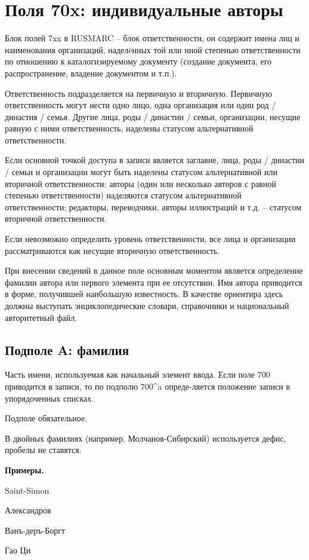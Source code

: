 \chapter{Поля 70x: индивидуальные авторы}

Блок полей 7xx в RUSMARC  -- блок ответственности, он содержит имена лиц и наименования организаций, надел\"eнных той или иной степенью ответственности по отношению к каталогизируемому документу (создание документа, его распространение, владение документом и т.п.).

Ответственность подразделяется на первичную и вторичную. Первичную ответственность могут нести одно лицо, одна организация или один род / династия / семья. Другие лица, роды / династии / семьи, организации, несущие равную с ними ответственность, наделены статусом альтернативной ответственности.

Если основной точкой доступа в записи является заглавие, лица, роды / династии / семьи и организации могут быть наделены статусом альтернативной или вторичной ответственности: авторы (один или несколько авторов с равной степенью ответственности) наделяются статусом альтернативной ответственности; редакторы, переводчики, авторы иллюстраций и т.д. -- статусом вторичной ответственности.

Если невозможно определить уровень ответственности, все лица и организации рассматриваются как несущие вторичную ответственность.

При внесении сведений в данное поле основным моментом является определение фамилии автора или первого элемента при ее отсутствии. Имя автора приводится в форме, получившей наибольшую известность. В качестве ориентира здесь должны выступать энциклопедические словари, справочники и национальный авторитетный файл.

\section{Подполе A: фамилия}

Часть имени, используемая как начальный элемент ввода. Если поле 700 приводится в записи, то по подполю 700\^{}a опреде-ляется положение записи в упорядоченных списках.

Подполе обязательное.

В двойных фамилиях (например, Молчанов-Сибирский) используется дефис, пробелы не ставятся.

\textbf{Примеры.}

\begin{cutelist}
    \item Saint-Simon
    \item Александров
    \item Ванъ-деръ-Боргт
    \item Гао Ци
\end{cutelist}

